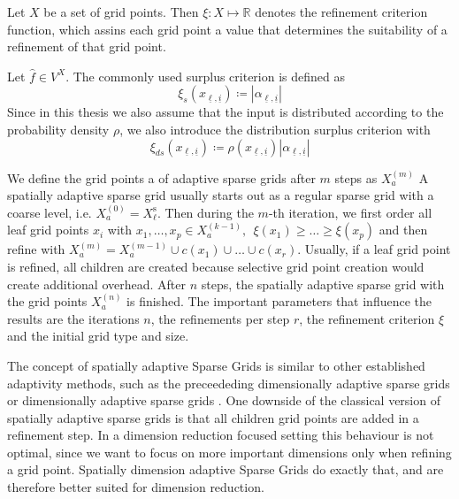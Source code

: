\documentclass[
  a4paper,  %
  twoside,  %
  bibliography=totoc,
  headsepline,
  cleardoublepage=empty,
  parskip=half,
  draft=false
]{scrbook}
\begin{document}
\begin{definition}
Let $X$ be a set of grid points.
Then $\xi \colon X \mapsto \mathds{R}$ denotes the refinement criterion function, which assins each grid point a value that determines the suitability of a refinement of that grid point.

Let $\hat{f} \in V^X$.
The commonly used surplus criterion is defined as
\begin{equation}
\xi_s(x_{\underline{\ell},\underline{i}}) \coloneqq |\alpha_{\underline{\ell},\underline{i}}|
\end{equation}
Since in this thesis we also assume that the input is distributed according to the probability density $\rho$, we also introduce the distribution surplus criterion with
\begin{equation}
\xi_{ds}(x_{\underline{\ell},\underline{i}}) \coloneqq \rho(x_{\underline{\ell},\underline{i}}) |\alpha_{\underline{\ell},\underline{i}}|
\end{equation}
\end{definition}
We define the grid points a of adaptive sparse grids after $m$ steps as $X_a^{(m)}$
A spatially adaptive sparse grid usually starts out as a regular sparse grid with a coarse level, i.e. $X_a^{(0)}=X^{\text{s}}_{\ell}$.
Then during the $m$-th iteration, we first order all leaf grid points $x_i$ with $x_1, \dots, x_p \in X_a^{(k-1)}, ~~ \xi(x_1) \geq \dots \geq \xi(x_p)$ and then refine with $X_a^{(m)}=X_a^{(m-1)} \cup c(x_1) \cup \dots \cup c(x_r)$.
Usually, if a leaf grid point is refined, all children are created because selective grid point creation would create additional overhead.
After $n$ steps, the spatially adaptive sparse grid with the grid points $X_a^{(n)}$ is finished.
The important parameters that influence the results are the iterations $n$, the refinements per step $r$, the refinement criterion $\xi$ and the initial grid type and size.

The concept of spatially adaptive Sparse Grids is similar to other established adaptivity methods, such as the preceededing  dimensionally adaptive sparse grids \cite{} or dimensionally adaptive sparse grids \cite{}.
One downside of the classical version of spatially adaptive sparse grids is that all children grid points are added in a refinement step.
In a dimension reduction focused setting this behaviour is not optimal, since we want to focus on more important dimensions only when refining a grid point.
Spatially dimension adaptive Sparse Grids do exactly that, and are therefore better suited for dimension reduction.
\end{document}
